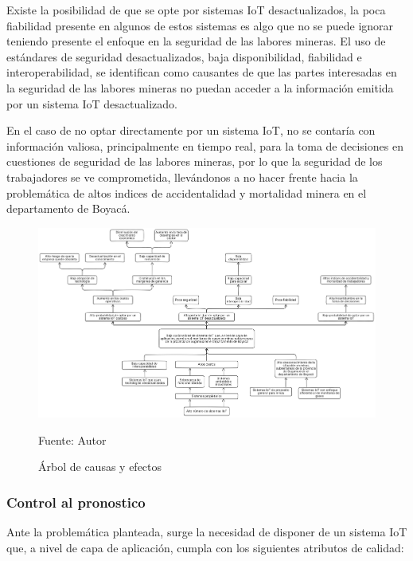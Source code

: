 \documentclass[stu,12pt,floatsintext]{apa7}
\begin{document}
	Existe la posibilidad de que se opte por sistemas IoT desactualizados, la poca fiabilidad presente en algunos de estos sistemas es algo que no se puede ignorar teniendo presente el enfoque en la seguridad de las labores mineras. El uso de estándares de seguridad desactualizados, baja disponibilidad, fiabilidad e interoperabilidad, se identifican como causantes de que las partes interesadas en la seguridad de las labores mineras no puedan acceder a la información emitida por un sistema IoT desactualizado. 
	
	En el caso de no optar directamente por un sistema IoT, no se contaría con información valiosa, principalmente en tiempo real, para la toma de decisiones en cuestiones de seguridad de las labores mineras, por lo que la seguridad de los trabajadores se ve comprometida, llevándonos a no hacer frente hacia la problemática de altos indices de accidentalidad y mortalidad minera en el departamento de Boyacá\cite{anm2020}.
		\begin{figure}[H]
		\centering
		\includegraphics[scale=0.142]{arbol-causas-efectos}
		\captionsetup{justification=centering}
		\caption{Árbol de causas y efectos}
		\small
		Fuente: Autor
	\end{figure}
	
	\subsubsection{Control al pronostico}
	Ante la problemática planteada, surge la necesidad de disponer de un sistema IoT que, a nivel de capa de aplicación, cumpla con los siguientes atributos de calidad:
	
\end{document}
